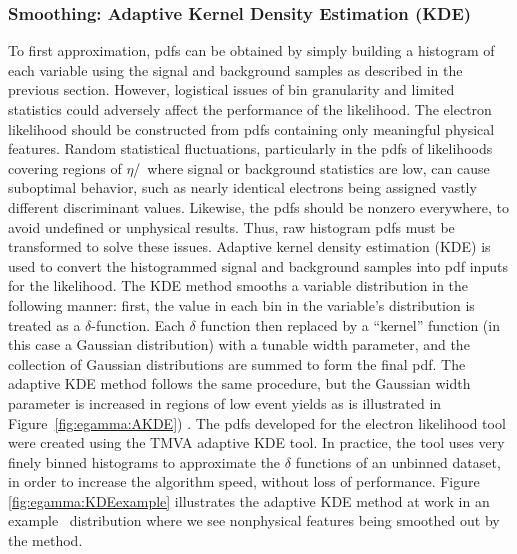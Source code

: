 \subsubsection{Smoothing: Adaptive Kernel Density Estimation (KDE)}
To first approximation, pdfs can be obtained by simply building a histogram of each variable using the signal and background samples as described in the previous section. However, logistical issues of bin granularity and limited statistics could adversely affect the performance of the likelihood. 
The electron likelihood should be constructed from pdfs containing only meaningful physical features.
Random statistical fluctuations, particularly in the pdfs of likelihoods covering regions of $\eta$/\et\ where signal or background statistics are low, can cause suboptimal behavior, such as nearly identical electrons being assigned vastly different discriminant values.
Likewise, the pdfs should be nonzero everywhere, to avoid undefined or unphysical results. Thus, raw histogram pdfs must be transformed to solve these issues.
Adaptive kernel density estimation (KDE) is used to convert the histogrammed signal and background samples into pdf inputs for the likelihood.
The KDE method smooths a variable distribution in the following manner: first, the value in each bin in the variable’s distribution is treated as a  $\delta$-function. 
Each $\delta$ function then replaced by a ``kernel'' function (in this case a Gaussian distribution) with a tunable width parameter, and the collection of Gaussian distributions are summed to form the final pdf.
The adaptive KDE method follows the same procedure, but the Gaussian width parameter is increased in regions of low event yields as is illustrated in Figure~\ref{fig:egamma:AKDE}) \cite{Hocker}.
The pdfs developed for the electron likelihood tool were created using the TMVA adaptive KDE tool.
In practice, the tool uses very finely binned histograms to approximate the $\delta$ functions of an unbinned dataset, in order to increase the algorithm speed, without loss of performance.
Figure \ref{fig:egamma:KDEexample} illustrates the adaptive KDE method at work in an example \reta\ distribution where we see nonphysical features being smoothed out by the method.
